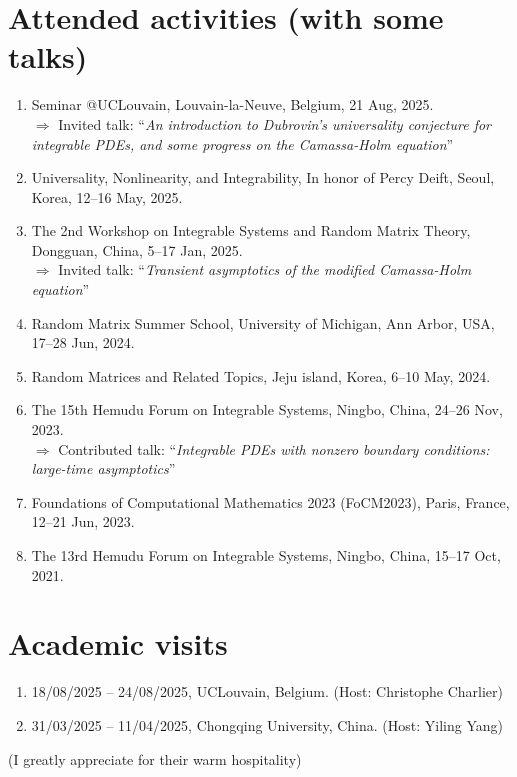 \documentclass[margin]{res}
\begin{document}
\begin{resume}
\section{Attended activities (with some talks)}
\begin{enumerate}[--]
\item Seminar @UCLouvain, Louvain-la-Neuve, Belgium, 21 Aug, 2025. \\ $\Rightarrow$ Invited talk: ``{\sl An introduction to Dubrovin's universality conjecture for integrable PDEs, and some progress on the Camassa-Holm equation}''
\item Universality, Nonlinearity, and Integrability, In honor of Percy Deift, Seoul, Korea, 12--16 May, 2025.
\item The 2nd Workshop on Integrable Systems and Random Matrix Theory, Dongguan, China, 5--17 Jan, 2025. \\ $\Rightarrow$ Invited talk: ``{\sl Transient asymptotics of the modified Camassa-Holm equation}''
\item Random Matrix Summer School, University of Michigan, Ann Arbor, USA, 17--28 Jun, 2024.
\item Random Matrices and Related Topics, Jeju island, Korea, 6--10 May, 2024.
\item The 15th Hemudu Forum on Integrable Systems, Ningbo, China, 24--26 Nov, 2023. \\  $\Rightarrow$ Contributed talk: ``{\sl Integrable PDEs with nonzero boundary conditions: large-time asymptotics}''
\item Foundations of Computational Mathematics 2023 (FoCM2023), Paris, France, 12--21 Jun, 2023.
\item The 13rd Hemudu Forum on Integrable Systems, Ningbo, China, 15--17 Oct, 2021.
\end{enumerate}


\section{Academic visits}
\begin{enumerate}[--]
\item 18/08/2025 -- 24/08/2025, UCLouvain, Belgium. (Host: Christophe Charlier)
\item 31/03/2025 -- 11/04/2025, Chongqing University, China. (Host: Yiling Yang)
\end{enumerate}
(I greatly appreciate for their warm hospitality)



\end{resume}
\end{document}
